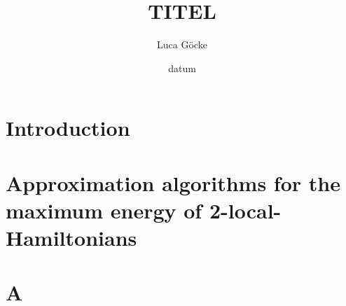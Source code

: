 \documentclass[pstricks,siunitx,theorem,british]{tumphthesis}
\title{TITEL}
\author{Luca Göcke}
\date{datum}
\begin{document}

\frontmatter
\maketitle
\tableofcontents

\mainmatter
\chapter{Introduction}



\chapter{Approximation algorithms for the maximum energy of 2-local-Hamiltonians}

\appendix
\chapter{A}

\backmatter
\printbibliography
\end{document}
